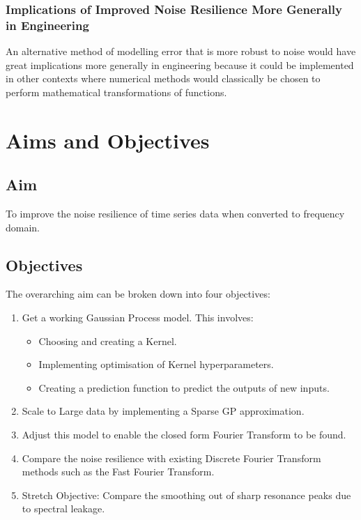 \documentclass[12pt]{article}
\begin{document}
    \subsubsection{Implications of Improved Noise Resilience More Generally in Engineering}

    An alternative method of modelling error that is more robust to noise would have great implications more generally in engineering because it could be implemented in other contexts where numerical methods would classically be chosen to perform mathematical transformations of functions.

    \section{Aims and Objectives}
    \subsection{Aim}
    To improve the noise resilience of time series data when converted to frequency domain.

    \subsection{Objectives}
    The overarching aim can be broken down into four objectives:
        \begin{enumerate}
            \item Get a working Gaussian Process model.
            This involves:
                \begin{itemize}
                    \item Choosing and creating a Kernel.
                    \item Implementing optimisation of Kernel hyperparameters. \label{item:nll}
                    \item Creating a prediction function to predict the outputs of new inputs. \label{item:predict}
                \end{itemize}
            \item Scale to Large data by implementing a Sparse GP approximation.
            \item Adjust this model to enable the closed form Fourier Transform to be found.
            \item Compare the noise resilience with existing Discrete Fourier Transform methods such as the Fast Fourier Transform.\label{noise-resiliance}
            \item Stretch Objective: Compare the smoothing out of sharp resonance peaks due to spectral leakage.\label{stretch-obj}
        \end{enumerate}
\end{document}
